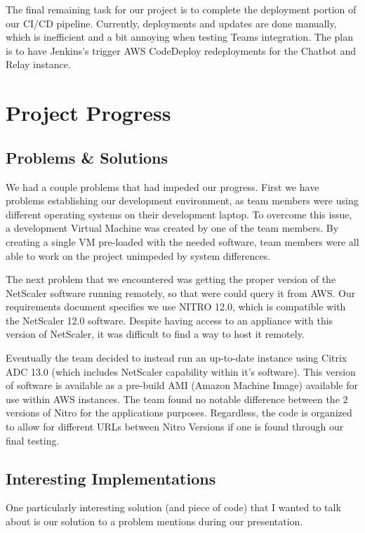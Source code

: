 \documentclass[onecolumn, draftclsnofoot,10pt, compsoc]{IEEEtran}
\begin{document}
The final remaining task for our project is to complete the deployment portion of our CI/CD pipeline.
Currently, deployments and updates are done manually, which is inefficient and a bit annoying when testing Teams integration.
The plan is to have Jenkins's trigger AWS CodeDeploy redeployments for the Chatbot and Relay instance.

\section{Project Progress}
\subsection{Problems & Solutions}
We had a couple problems that had impeded our progress.
First we have problems establishing our development environment, as team members were using different operating systems on their development laptop.
To overcome this issue, a development Virtual Machine was created by one of the team members.
By creating a single VM pre-loaded with the needed software, team members were all able to work on the project unimpeded by system differences.

The next problem that we encountered was getting the proper version of the NetScaler software running remotely, so that were could query it from AWS.
Our requirements document specifies we use NITRO 12.0, which is compatible with the NetScaler 12.0 software.
Despite having access to an appliance with this version of NetScaler, it was difficult to find a way to host it remotely.

Eventually the team decided to instead run an up-to-date instance using Citrix ADC 13.0 (which includes NetScaler capability within it's software).
This version of software is available as a pre-build AMI (Amazon Machine Image) available for use within AWS instances.
The team found no notable difference between the 2 versions of Nitro for the applications purposes.
Regardless, the code is organized to allow for different URLs between Nitro Versions if one is found through our final testing.

\subsection{Interesting Implementations}
One particularly interesting solution (and piece of code) that I wanted to talk about is our solution to a problem mentions during our presentation.
\end{document}
